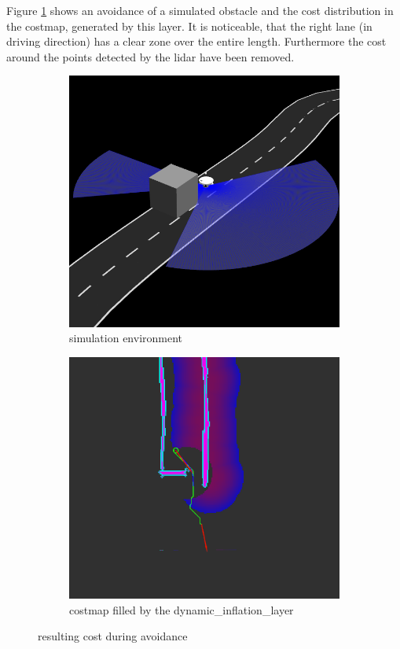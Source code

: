 Figure \ref{dyncost} shows an avoidance of a simulated obstacle and the cost distribution in the costmap, generated by this layer. It is noticeable, that the right lane (in driving direction) has a clear zone over the entire length. Furthermore the cost around the points detected by the lidar have been removed.


\begin{figure}[H]
	\centering
	\begin{subfigure}{.45\linewidth}
		\includegraphics[width=\textwidth]{Pictures/avoidance}
		\caption{simulation environment}
		\end{subfigure}	
	\begin{subfigure}{.45\linewidth}
		\includegraphics[width=\textwidth]{Pictures/avoid cost}
		\caption{costmap filled by the dynamic\_inflation\_layer}
	\end{subfigure}
	\caption{resulting cost during avoidance}
	\label{dyncost}
\end{figure}


